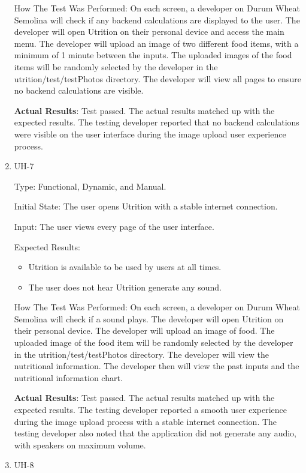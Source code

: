 \documentclass[12pt, titlepage]{article}
\begin{document}
\begin{enumerate}
		How The Test Was Performed: On each screen, a developer on Durum Wheat Semolina will check if any backend calculations are displayed to the user. The developer will open Utrition on their personal device and access the main menu. The developer will upload an image of two different food items, with a minimum of 1 minute between the inputs. The uploaded images of the food items will be randomly selected by the developer in the utrition/test/testPhotos directory. The developer will view all pages to ensure no backend calculations are visible.
		
		\textbf{Actual Results}: Test passed. The actual results matched up with the expected results. The testing developer reported that no backend calculations were visible on the user interface during the image upload user experience process.
		
		\item{UH-7}
		
		Type: Functional, Dynamic, and Manual.
		
		Initial State: The user opens Utrition with a stable internet connection.
		
		Input: The user views every page of the user interface.
		
		Expected Results: 
		\begin{itemize}
			\item Utrition is available to be used by users at all times.
			\item The user does not hear Utrition generate any sound.
		\end{itemize}
		
		How The Test Was Performed: On each screen, a developer on Durum Wheat Semolina will check if a sound plays. The developer will open Utrition on their personal device. The developer will upload an image of food. The uploaded image of the food item will be randomly selected by the developer in the utrition/test/testPhotos directory. The developer will view the nutritional information. The developer then will view the past inputs and the nutritional information chart.
		
		\textbf{Actual Results}: Test passed. The actual results matched up with the expected results. The testing developer reported a smooth user experience during the image upload process with a stable internet connection. The testing developer also noted that the application did not generate any audio, with speakers on maximum volume.
		
		\item{UH-8}
		

\end{enumerate}
\end{document}
